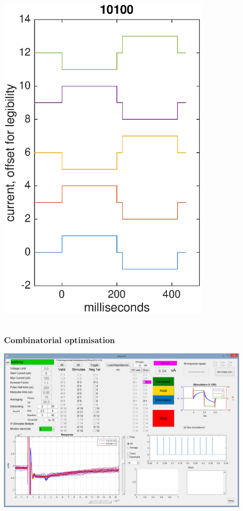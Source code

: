 \documentclass{beamer}
\begin{document}
\begin{frame}
\begin{columns}
\begin{center}
      \includegraphics[width=0.8\textwidth]{pulsedemo}
    \end{center}
  \end{columns}
\end{frame}

\begin{frame}
  \frametitle{Combinatorial optimisation}
  \includegraphics[width=0.95\textwidth]{plexme}
\end{frame}
\end{document}
